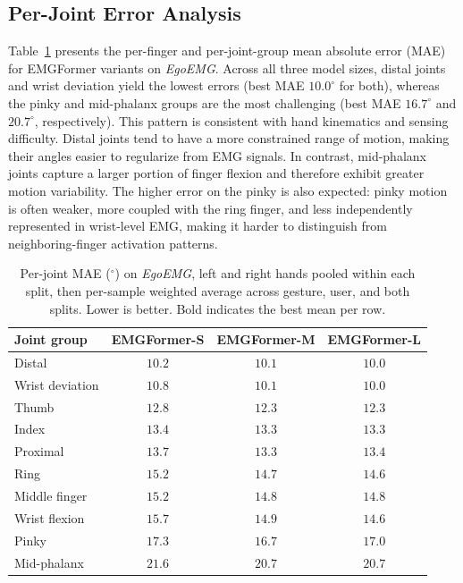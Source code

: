 \documentclass{article}
\newcommand{\dataset}{\textit{EgoEMG}}
\newcommand{\model}{EMGFormer}
\begin{document}
\subsection{Per-Joint Error Analysis}
\label{app:per_joint}

Table~\ref{tab:per_joint_egoemg} presents the per-finger and per-joint-group mean absolute error (MAE) for \model{} variants on \dataset{}. Across all three model sizes, distal joints and wrist deviation yield the lowest errors (best MAE $10.0^\circ$ for both), whereas the pinky and mid-phalanx groups are the most challenging (best MAE $16.7^\circ$ and $20.7^\circ$, respectively). This pattern is consistent with hand kinematics and sensing difficulty. Distal joints tend to have a more constrained range of motion, making their angles easier to regularize from EMG signals. In contrast, mid-phalanx joints capture a larger portion of finger flexion and therefore exhibit greater motion variability. The higher error on the pinky is also expected: pinky motion is often weaker, more coupled with the ring finger, and less independently represented in wrist-level EMG, making it harder to distinguish from neighboring-finger activation patterns.

\begin{table}[h]
\centering
\caption{Per-joint MAE ($^\circ$) on \dataset{}, left and right hands pooled within each split, then per-sample weighted average across gesture, user, and both splits. Lower is better. Bold indicates the best mean per row.}
\label{tab:per_joint_egoemg}
\footnotesize
\setlength{\tabcolsep}{3.5pt}
\renewcommand{\arraystretch}{1.05}
\begin{tabular}{lccc}
\toprule
Joint group & \model{}-S & \model{}-M & \model{}-L \\
\midrule
Distal & $10.2$ & $10.1$ & $\mathbf{10.0}$ \\
Wrist deviation & $10.8$ & $10.1$ & $\mathbf{10.0}$ \\
Thumb & $12.8$ & $\mathbf{12.3}$ & $\mathbf{12.3}$ \\
Index & $13.4$ & $\mathbf{13.3}$ & $13.3$ \\
Proximal & $13.7$ & $\mathbf{13.3}$ & $13.4$ \\
Ring & $15.2$ & $14.7$ & $\mathbf{14.6}$ \\
Middle finger & $15.2$ & $14.8$ & $\mathbf{14.8}$ \\
Wrist flexion & $15.7$ & $14.9$ & $\mathbf{14.6}$ \\
Pinky & $17.3$ & $\mathbf{16.7}$ & $17.0$ \\
Mid-phalanx & $21.6$ & $\mathbf{20.7}$ & $\mathbf{20.7}$ \\
\bottomrule
\end{tabular}
\end{table}
\end{document}
